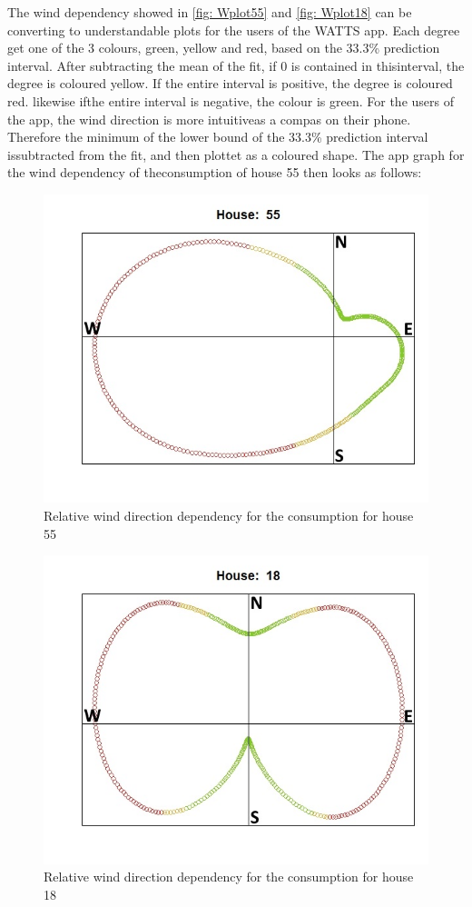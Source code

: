 \noindent The wind dependency showed in \cref{fig: Wplot55} and \cref{fig: Wplot18} can be converting to understandable plots for the users of the WATTS app. Each degree get one of the 3 colours, green, yellow and red, based on the 33.3\% prediction interval.  After subtracting the mean of the fit, if 0 is contained in thisinterval, the degree is coloured yellow.  If the entire interval is positive, the degree is coloured red.  likewise ifthe entire interval is negative, the colour is green.  For the users of the app, the wind direction is more intuitiveas a compas on their phone.  Therefore the minimum of the lower bound of the 33.3\% prediction interval issubtracted from the fit, and then plottet as a coloured shape.  The app graph for the wind dependency of theconsumption of house 55 then looks as follows:
\begin{figure}[H]
    \centering
    \includegraphics[width=.8\textwidth]{../../../figures/WKplot55.jpeg}
    \caption{Relative wind direction dependency for the consumption for house 55}
    \label{fig: WKplot55}
\end{figure}
\begin{figure}[H]
    \centering
    \includegraphics[width=.8\textwidth]{../../../figures/WKplot18.jpeg}
    \caption{Relative wind direction dependency for the consumption for house 18}
    \label{fig: WKplot18}
\end{figure}


